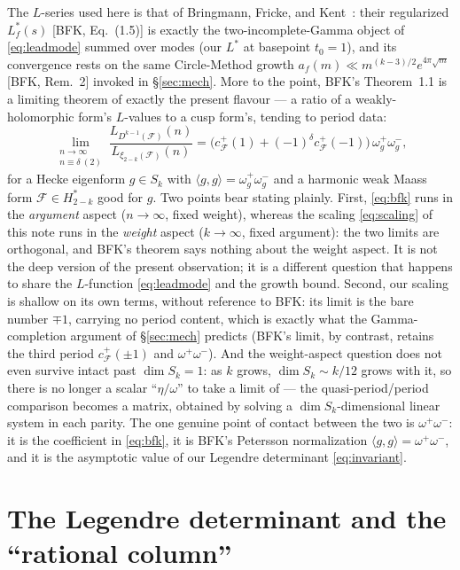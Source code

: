 \documentclass[11pt]{article}
\begin{document}
The $L$-series used here is that of Bringmann, Fricke, and Kent~\cite{BFK2011}: their
regularized $L_f^*(s)$ [BFK, Eq.~(1.5)] is exactly the two-incomplete-Gamma object of
\eqref{eq:leadmode} summed over modes (our $L^*$ at basepoint $t_0=1$), and its convergence
rests on the same Circle-Method growth $a_f(m)\ll m^{(k-3)/2}e^{4\pi\sqrt{m}}$ [BFK, Rem.~2]
invoked in \S\ref{sec:mech}. More to the point, BFK's Theorem~1.1 is a limiting theorem of
exactly the present flavour --- a ratio of a weakly-holomorphic form's $L$-values to a cusp
form's, tending to period data:
\begin{equation}\label{eq:bfk}
\lim_{\substack{n\to\infty\\ n\equiv\delta\ (2)}}
\frac{L_{D^{k-1}(\mathcal F)}(n)}{L_{\xi_{2-k}(\mathcal F)}(n)}
=\big(c_{\mathcal F}^+(1)+(-1)^\delta c_{\mathcal F}^+(-1)\big)\,\omega_g^+\omega_g^-,
\end{equation}
for a Hecke eigenform $g\in S_k$ with $\langle g,g\rangle=\omega_g^+\omega_g^-$ and a
harmonic weak Maass form $\mathcal F\in H_{2-k}^*$ good for $g$. Two points bear stating
plainly. First, \eqref{eq:bfk} runs in the \emph{argument} aspect ($n\to\infty$, fixed
weight), whereas the scaling \eqref{eq:scaling} of this note runs in the \emph{weight}
aspect ($k\to\infty$, fixed argument): the two limits are orthogonal, and BFK's theorem
says nothing about the weight aspect. It is not the deep version of the present
observation; it is a different question that happens to share the $L$-function
\eqref{eq:leadmode} and the growth bound. Second, our scaling is shallow on its own terms,
without reference to BFK: its limit is the bare number $\mp1$, carrying no period content,
which is exactly what the Gamma-completion argument of \S\ref{sec:mech} predicts (BFK's
limit, by contrast, retains the third period $c_{\mathcal F}^+(\pm1)$ and
$\omega^+\omega^-$). And the weight-aspect question does not even survive intact past
$\dim S_k=1$: as $k$ grows, $\dim S_k\sim k/12$ grows with it, so there is no longer a
scalar ``$\eta/\omega$'' to take a limit of --- the quasi-period/period comparison becomes
a matrix, obtained by solving a $\dim S_k$-dimensional linear system in each parity. The
one genuine point of contact between the two is $\omega^+\omega^-$: it is the coefficient in
\eqref{eq:bfk}, it is BFK's Petersson normalization $\langle g,g\rangle=\omega^+\omega^-$,
and it is the asymptotic value of our Legendre determinant \eqref{eq:invariant}.

\section{The Legendre determinant and the ``rational column''}\label{sec:legendre}
\end{document}
